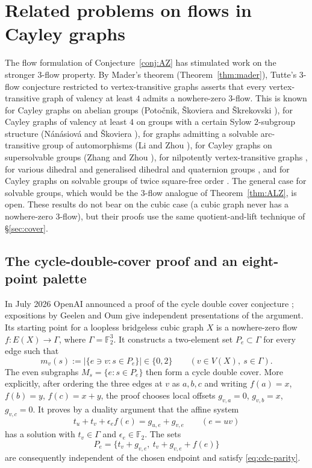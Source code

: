 \documentclass[11pt,a4paper]{article}
\theoremstyle{definition}
\theoremstyle{remark}
\begin{document}
\section{Related problems on flows in Cayley graphs}\label{sec:related}

The flow formulation of Conjecture~\ref{conj:AZ} has stimulated work on the stronger $3$-flow property.  By Mader's theorem (Theorem~\ref{thm:mader}), Tutte's $3$-flow conjecture restricted to vertex-transitive graphs asserts that every vertex-transitive graph of valency at least $4$ admits a nowhere-zero $3$-flow.  This is known for Cayley graphs on abelian groups (Poto\v{c}nik, \v{S}koviera and \v{S}krekovski \cite{PSS05}), for Cayley graphs of valency at least $4$ on groups with a certain Sylow $2$-subgroup structure (N\'an\'asiov\'a and \v{S}koviera \cite{NanasiovaSkoviera09}), for graphs admitting a solvable arc-transitive group of automorphisms (Li and Zhou \cite{LiZhou16}), for Cayley graphs on supersolvable groups (Zhang and Zhou \cite{ZhangZhou24}), for nilpotently vertex-transitive graphs \cite{ZhangZhou22b}, for various dihedral and generalised dihedral and quaternion groups \cite{YangLi11,AhanjidehIranmanesh19}, and for Cayley graphs on solvable groups of twice square-free order \cite{AhanjidehKovacs26}.  The general case for solvable groups, which would be the $3$-flow analogue of Theorem~\ref{thm:ALZ}, is open.  These results do not bear on the cubic case (a cubic graph never has a nowhere-zero $3$-flow), but their proofs use the same quotient-and-lift technique of \S\ref{sec:cover}.

\subsection{The cycle-double-cover proof and an eight-point palette}\label{sec:cdc-palette}

In July 2026 OpenAI announced a proof of the cycle double cover conjecture \cite{OpenAICDC26}; expositions by Geelen \cite{Geelen26} and Oum \cite{Oum26} give independent presentations of the argument.  Its starting point for a loopless bridgeless cubic graph $X$ is a nowhere-zero flow $f\colon E(X)\to\Gamma$, where $\Gamma=\mathbb F_2^3$.  It constructs a two-element set $P_e\subset\Gamma$ for every edge such that
\begin{equation}\label{eq:cdc-parity}
 m_v(s):=|\{e\ni v:s\in P_e\}|\in\{0,2\}
 \qquad(v\in V(X),\ s\in\Gamma).
\end{equation}
The even subgraphs $M_s=\{e:s\in P_e\}$ then form a cycle double cover.  More explicitly, after ordering the three edges at $v$ as $a,b,c$ and writing $f(a)=x$, $f(b)=y$, $f(c)=x+y$, the proof chooses local offsets $g_{v,a}=0$, $g_{v,b}=x$, $g_{v,c}=0$.  It proves by a duality argument that the affine system
\begin{equation}\label{eq:cdc-system}
 t_u+t_v+\epsilon_e f(e)=g_{u,e}+g_{v,e}
 \qquad(e=uv)
\end{equation}
has a solution with $t_v\in\Gamma$ and $\epsilon_e\in\mathbb F_2$.  The sets
\[
 P_e=\{t_v+g_{v,e},\ t_v+g_{v,e}+f(e)\}
\]
are consequently independent of the chosen endpoint and satisfy \eqref{eq:cdc-parity}.
\end{document}
